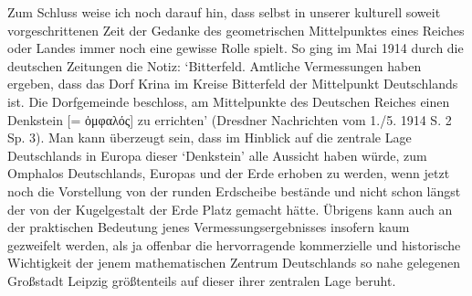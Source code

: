 \documentclass[a4paper, 11pt, oneside]{article}
\begin{document}
Zum Schluss weise ich noch darauf hin, dass selbst in unserer kulturell soweit vorgeschrittenen Zeit der Gedanke des geometrischen Mittelpunktes eines Reiches oder Landes immer noch eine gewisse Rolle spielt. So ging im Mai 1914 durch die deutschen Zeitungen die Notiz: `Bitterfeld. Amtliche Vermessungen haben ergeben, dass das Dorf Krina im Kreise Bitterfeld der Mittelpunkt Deutschlands ist. Die Dorfgemeinde beschloss, am Mittelpunkte des Deutschen Reiches einen Denkstein [= ὀμφαλός] zu errichten' (Dresdner Nachrichten vom 1./5. 1914 S. 2 Sp. 3). Man kann überzeugt sein, dass im Hinblick auf die zentrale Lage Deutschlands in Europa dieser `Denkstein' alle Aussicht haben würde, zum Omphalos Deutschlands, Europas und der Erde erhoben zu werden, wenn jetzt noch die Vorstellung von der runden Erdscheibe bestände und nicht schon längst der von der Kugelgestalt der Erde Platz gemacht hätte. Übrigens kann auch an der praktischen Bedeutung jenes Vermessungsergebnisses insofern kaum gezweifelt werden, als ja offenbar die hervorragende kommerzielle und historische Wichtigkeit der jenem mathematischen Zentrum Deutschlands so nahe gelegenen Großstadt Leipzig größtenteils auf dieser ihrer zentralen Lage beruht.
\end{document}
